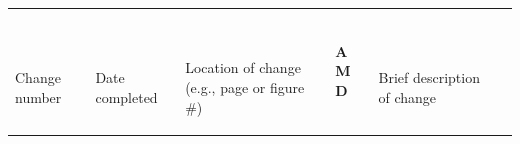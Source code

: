 \documentclass[twoside,letterpaper]{article}
\begin{document}
\bigskip

\begin{flushleft}
\tablehead{}
\begin{supertabular}{|m{0.47685984in}|m{1.2418196in}|m{1.3587599in}|m{0.23375985in}|m{2.0462599in}|m{0.7337598in}|}
\hline
~

\centering {}\color{black} Change number &
~

\centering {}\color{black} Date completed &
~

\centering {}\color{black} Location of change
(e.g., page or figure \#) &
\centering {}\bfseries\color{black} A\newline
M\newline
D &
~

\centering {}\color{black} Brief description of
change &
~


\end{supertabular}
\end{flushleft}
\end{document}
